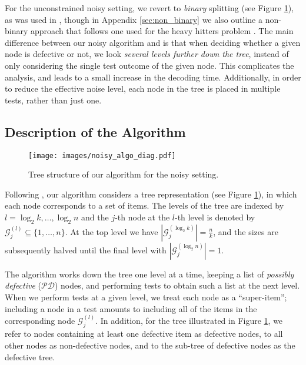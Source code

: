 For the unconstrained noisy setting, we revert to {\em binary} splitting (see Figure \ref{fig:noisy_algo_diag}), as was used in \cite{cher20,Eri20}, though in Appendix \ref{sec:non_binary} we also outline a non-binary approach that follows one used for the heavy hitters problem \cite{Cor08,Ind11}.  The main difference between our noisy algorithm and \cite{cher20,Eri20} is that when deciding whether a given node is defective or not, we look {\em several levels further down the tree}, instead of only considering the single test outcome of the given node.  This complicates the analysis, and leads to a small increase in the decoding time.  Additionally, in order to reduce the effective noise level, each node in the tree is placed in multiple tests, rather than just one.

\subsection{Description of the Algorithm} \label{sec:noisy_algo_descrip}

\begin{figure}[t]
    \centering
    \texttt{[image: images/noisy\_algo\_diag.pdf]}
    \caption{Tree structure of our algorithm for the noisy setting.} %
    \label{fig:noisy_algo_diag}
\end{figure}

Following \cite{cher20,Eri20}, our algorithm considers a tree representation (see Figure \ref{fig:noisy_algo_diag}), in which each node corresponds to a set of items. The levels of the tree are indexed by $l=\log_2k,\dots,\log_2n$ and the $j$-th node at the $l$-th level is denoted by $\mathcal{G}_j^{(l)}\subseteq\{1,\dots,n\}$.  At the top level we have $|\mathcal{G}_j^{(\log_2 k)}| = \frac{n}{k}$, and the sizes are subsequently halved until the final level with $|\mathcal{G}_j^{(\log_2 n)}| =1$.

The algorithm works down the tree one level at a time, keeping a list of \textit{possibly defective} ($\mathcal{PD}$) nodes, and performing tests to obtain such a list at the next level. When we perform tests at a given level, we treat each node as a ``super-item''; including a node in a test amounts to including all of the items in the corresponding node $\mathcal{G}_j^{(l)}$. In addition, for the tree illustrated in Figure \ref{fig:noisy_algo_diag}, we refer to nodes containing at least one defective item as defective nodes, to all other nodes as non-defective nodes, and to the sub-tree of defective nodes as the defective tree.

